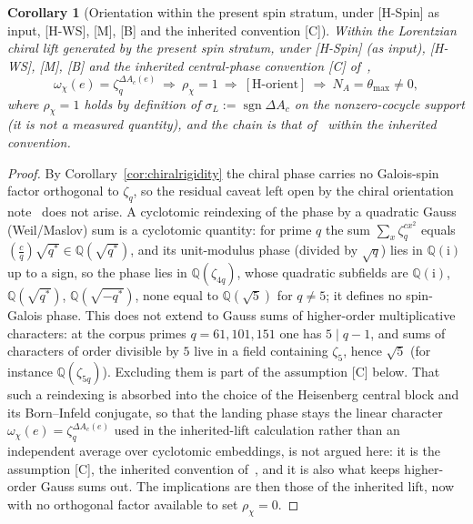 \documentclass[11pt]{article}
\newtheorem{corollary}{Corollary}
\theoremstyle{definition}
\theoremstyle{remark}
\begin{document}
    \begin{corollary}[Orientation within the present spin stratum, under {[H-Spin]} as input, {[H-WS]}, {[M]}, {[B]} and the inherited convention {[C]}]
      \label{cor:orient}
      Within the Lorentzian chiral lift generated by the present spin stratum, under [H-Spin] (as input), [H-WS], [M], [B] and
the inherited central-phase convention [C] of~\cite{Beau2026cho},
      \[
        \omega_\chi(e)=\zeta_q^{\Delta A_c(e)}
        \ \Longrightarrow\ \rho_\chi=1
        \ \Longrightarrow\ [\mathrm{H\text{-}orient}]
        \ \Longrightarrow\ N_A=\theta_{\max}\neq0 ,
      \]
      where $\rho_\chi=1$ holds by definition of $\sigma_L:=\operatorname{sgn}\Delta A_c$ on the nonzero-cocycle support
      (it is not a measured quantity), and the chain is that of~\cite{Beau2026cho,Beau2026q11of} within the inherited
      convention.
    \end{corollary}

    \begin{proof}
      By Corollary~\ref{cor:chiralrigidity} the chiral phase carries no Galois-spin factor orthogonal to $\zeta_q$, so
      the residual caveat left open by the chiral orientation note~\cite{Beau2026cho} does not arise.
      A cyclotomic reindexing of the phase by a quadratic Gauss (Weil/Maslov) sum is a cyclotomic quantity: for prime $q$
the sum $\sum_x\zeta_q^{cx^2}$ equals $\left(\tfrac{c}{q}\right)\sqrt{q^{*}}\in\mathbb{Q}(\sqrt{q^{*}})$, and its
unit-modulus phase (divided by $\sqrt q$) lies in $\mathbb{Q}(\mathrm{i})$ up to a sign, so the phase lies in
$\mathbb{Q}(\zeta_{4q})$, whose quadratic subfields are $\mathbb{Q}(\mathrm{i})$, $\mathbb{Q}(\sqrt{q^{*}})$,
$\mathbb{Q}(\sqrt{-q^{*}})$, none equal to $\mathbb{Q}(\sqrt{5})$ for $q\neq5$; it defines no spin-Galois phase.
This does not extend to Gauss sums of higher-order multiplicative characters: at the corpus primes
$q=61,101,151$ one has $5\mid q-1$, and sums of characters of order divisible by $5$ live in a field containing $\zeta_5$, hence $\sqrt{5}$ (for instance
$\mathbb{Q}(\zeta_{5q})$).
Excluding them is part of the assumption [C] below.
      That such a reindexing is absorbed into the choice of the Heisenberg central block and its Born--Infeld
      conjugate, so that the landing phase stays the linear character $\omega_\chi(e)=\zeta_q^{\Delta A_c(e)}$ used in the
      inherited-lift calculation rather than an independent average over cyclotomic embeddings, is not argued here: it
is the assumption [C], the inherited convention of~\cite{Beau2026cho}, and it is also what keeps higher-order Gauss
sums out.
      The implications are then those of the inherited lift, now with no orthogonal factor available to set
      $\rho_\chi=0$.
    \end{proof}
\end{document}
